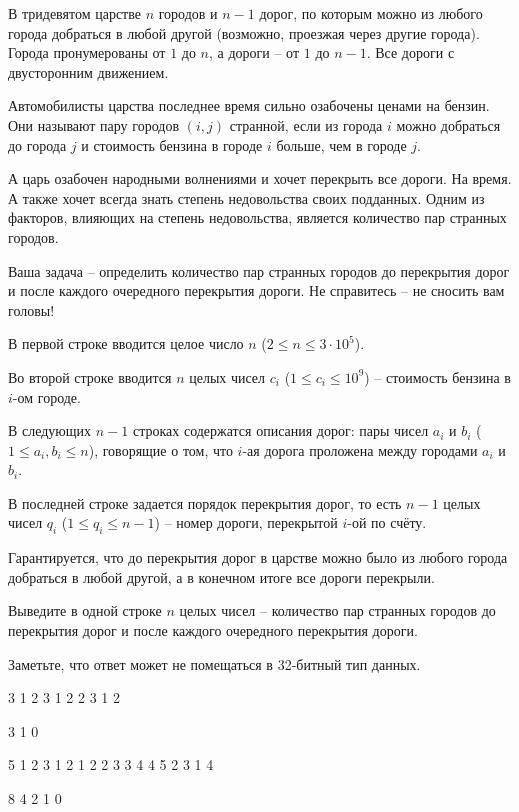 
В тридевятом царстве $n$ городов и $n - 1$ дорог, по которым можно из любого города добраться в любой другой (возможно, проезжая через другие города). Города пронумерованы от $1$ до $n$, а дороги -- от $1$ до $n - 1$. Все дороги с двусторонним движением.

Автомобилисты царства последнее время сильно озабочены ценами на бензин. Они называют пару городов $(i, j)$ странной, если из города $i$ можно добраться до города $j$ и стоимость бензина в городе $i$ больше, чем в городе $j$.

А царь озабочен народными волнениями и хочет перекрыть все дороги. На время. А также хочет всегда знать степень недовольства своих подданных. Одним из факторов, влияющих на степень недовольства, является количество пар странных городов.

Ваша задача -- определить количество пар странных городов до перекрытия дорог и после каждого очередного перекрытия дороги. Не справитесь -- не сносить вам головы!


В первой строке вводится целое число $n$ ($2 \le n \le 3 \cdot 10^5$).

Во второй строке вводится $n$ целых чисел $c_i$ ($1 \le c_i \le 10^9$) -- стоимость бензина в $i$-ом городе.

В следующих $n - 1$ строках содержатся описания дорог: пары чисел $a_i$ и $b_i$ \linebreak ($1 \le a_i, b_i \le n$), говорящие о том, что $i$-ая дорога проложена между городами $a_i$ и $b_i$.

В последней строке задается порядок перекрытия дорог, то есть $n - 1$ целых чисел $q_i$ ($1 \le q_i \le n-1$) -- номер дороги, перекрытой $i$-ой по счёту.

Гарантируется, что до перекрытия дорог в царстве можно было из любого города добраться в любой другой, а в конечном итоге все дороги перекрыли.

\outputfmtSection

Выведите в одной строке $n$ целых чисел -- количество пар странных городов до перекрытия дорог и после каждого очередного перекрытия дороги.

Заметьте, что ответ может не помещаться в 32-битный тип данных.

\exampleSection


\begin{myverbbox}[\small]{\vinput}
3
1 2 3
1 2
2 3
1 2
\end{myverbbox}
\begin{myverbbox}[\small]{\voutput}
3 1 0
\end{myverbbox}


\begin{myverbbox}[\small]{\vinput}
5
1 2 3 1 2
1 2
2 3
3 4
4 5
2 3 1 4
\end{myverbbox}
\begin{myverbbox}[\small]{\voutput}
8 4 2 1 0
\end{myverbbox}



